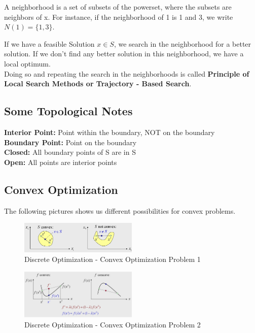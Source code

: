 A neighborhood is a set of subsets of the powerset, where the subsets are neighbors of x. For instance, if the neighborhood of 1 is 1 and 3, we write $N(1) = \{1, 3\}$.

\begin{tcolorbox}[colback=red!5!white,colframe=red!75!black]
If we have a feasible Solution $x \in S$, we search in the neighborhood for a better solution. If we don't find any better solution in this neighborhood, we have a local optimum. \\
Doing so and repeating the search in the neighborhoods is called \textbf{Principle of Local Search Methods or Trajectory - Based Search}.
\end{tcolorbox}

\subsection{Some Topological Notes}
\textbf{Interior Point:} Point within the boundary, NOT on the boundary \\
\textbf{Boundary Point:} Point on the boundary \\
\textbf{Closed:} All boundary points of S are in S \\
\textbf{Open:} All points are interior points

\subsection{Convex Optimization}

The following pictures shows us different possibilities for convex problems.

\begin{figure}[H]
\centering
\includegraphics[width=0.5\textwidth]{figures/convexOptimization1.png}
\caption{Discrete Optimization - Convex Optimization Problem 1}
\end{figure}

\begin{figure}[H]
\centering
\includegraphics[width=0.5\textwidth]{figures/convexOptimization2.png}
\caption{Discrete Optimization - Convex Optimization Problem 2}
\end{figure}

